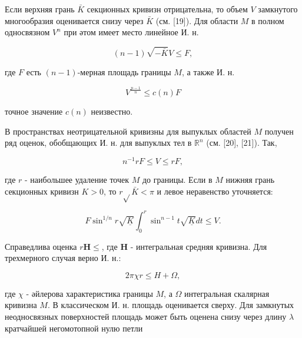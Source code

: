 \documentclass[10pt]{article}
\begin{document}
Если верхняя грань $\bar{K}$ секционных кривизн отрицательна, то объем $V$ замкнутого многообразия оценивается снизу через $\bar{K}$ (см. [19]). Для области $M$ в полном односвязном $V^{n}$ при әтом имеет место линейное И. н.



\[

(n-1) \sqrt{-\bar{K}} V \leqslant F,

\]



где $F$ есть $(n-1)$-мерная площадь границы $M$, а также И. н.



\[

V^{\frac{n-1}{n}} \leqslant c(n) F

\]



точное значение $c(n)$ неизвестно.



В пространствах неотрицательной кривизны для выпуклых областей $M$ получен ряд оценок, обобщающих И. н. для выпуклых тел в $\mathbb{R}^{n}$ (см. [20], [21]). Так,



\[

n^{-1} r F \leqslant V \leqslant r F,

\]



где $r$ - наибольшее удаление точек $M$ до границы. Если в $M$ нижняя грань секционных кривизн $K>0$, то $r \sqrt{ } \bar{K}<\pi$ и левое неравенство уточняется:



\[

F \sin ^{1 / n} r \sqrt{\underline{K}} \int_{0}^{r} \sin ^{n-1} t \sqrt{\underline{K}} d t \leqslant V .

\]



Справедлива оценка $r \boldsymbol{H} \leqslant$, где $\boldsymbol{H}$ - интегральная средняя кривизна. Для трехмерного случая верно И. н.:



\[

2 \pi \chi r \leqslant H+\Omega,

\]



где $\chi$ - әйлерова характеристика границы $M$, а $\Omega$ интегральная скалярная кривизна $M$. В классическом И. н. площадь оценивается сверху. Для замкнутых неодносвязных поверхностей площадь может быть оценена снизу через длину $\lambda$ кратчайшей негомотопной нулю петли
\end{document}
